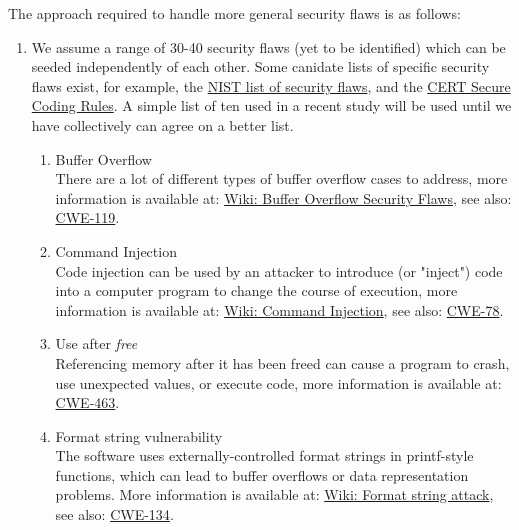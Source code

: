 The approach required to handle more general security flaws is as follows:
\begin{enumerate}
   \item We assume a range of 30-40 security flaws (yet to be identified)
         which can be seeded independently of each other.  Some canidate lists of
         specific security flaws exist,
         for example, the \href{http://nvd.nist.gov/cwe.cfm}{NIST list of security flaws}, 
         and the 
         \href{https://www.securecoding.cert.org/confluence/display/seccode/CERT+Secure+Coding+Standards}{CERT Secure Coding Rules}.
         A simple list of ten used in a recent study will be used until we have
         collectively can agree on a better list.
      \begin{enumerate}
         \item Buffer Overflow \\
               There are a lot of different types of buffer overflow cases to address,
               more information is available at:
               \href{http://en.wikipedia.org/wiki/Buffer_overflow}{Wiki: Buffer Overflow Security Flaws},
               see also:
               \href{http://cwe.mitre.org/data/definitions/119.html}{CWE-119}.

         \item Command Injection \\
               Code injection can be used by an attacker to introduce (or "inject") code
               into a computer program to change the course of execution, more information
               is available at:
               \href{http://en.wikipedia.org/wiki/Command_injection}{Wiki: Command Injection},
               see also:
               \href{http://cwe.mitre.org/data/definitions/78.html}{CWE-78}.

         \item Use after {\em free} \\
               Referencing memory after it has been freed can cause a program to crash,
               use unexpected values, or execute code, more information is available at:
               \href{http://cwe.mitre.org/data/definitions/463.html}{CWE-463}.

         \item Format string vulnerability \\
               The software uses externally-controlled format strings in printf-style
               functions, which can lead to buffer overflows or data representation
               problems. More information is available at:
               \href{http://en.wikipedia.org/wiki/Format_string_vulnerabilities}{Wiki: Format string attack}, 
               see also:
               \href{http://cwe.mitre.org/data/definitions/134.html}{CWE-134}.


\end{enumerate}
\end{enumerate}
